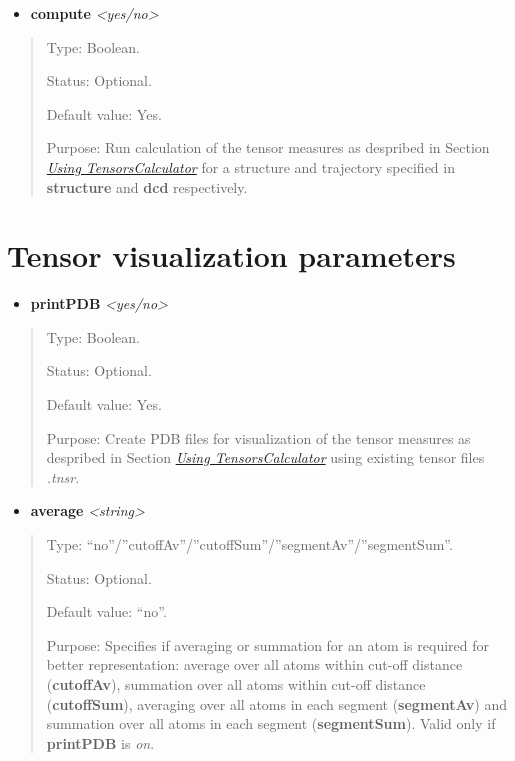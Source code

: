 \documentclass[letterpaper,10pt,english]{sphinxmanual}
\begin{document}
\begin{itemize}
\item {} 
\textbf{compute} \emph{\textless{}yes/no\textgreater{}}

\end{itemize}
\begin{quote}

Type: Boolean.

Status: Optional.

Default value: Yes.

Purpose: Run calculation of the tensor measures as despribed in Section {\hyperref[general:usingtc]{\emph{Using TensorsCalculator}}} for a structure and trajectory specified in \textbf{structure} and \textbf{dcd} respectively.
\end{quote}


\section{Tensor visualization parameters}
\label{general:tensor-visualization-parameters}\begin{itemize}
\item {} 
\textbf{printPDB} \emph{\textless{}yes/no\textgreater{}}

\end{itemize}
\begin{quote}

Type: Boolean.

Status: Optional.

Default value: Yes.

Purpose: Create PDB files for visualization of the tensor measures as despribed in Section {\hyperref[general:usingtc]{\emph{Using TensorsCalculator}}} using existing tensor files \emph{.tnsr}.
\end{quote}
\begin{itemize}
\item {} 
\textbf{average} \emph{\textless{}string\textgreater{}}

\end{itemize}
\begin{quote}

Type: ``no''/''cutoffAv''/''cutoffSum''/''segmentAv''/''segmentSum''.

Status: Optional.

Default value: ``no''.

Purpose: Specifies if averaging or summation for an atom is required for better representation: average over all atoms within cut-off distance (\textbf{cutoffAv}), summation over all atoms within cut-off distance (\textbf{cutoffSum}), averaging over all atoms in each segment (\textbf{segmentAv}) and summation over all atoms in each segment (\textbf{segmentSum}). Valid only if \textbf{printPDB} is \emph{on}.
\end{quote}
\end{document}
